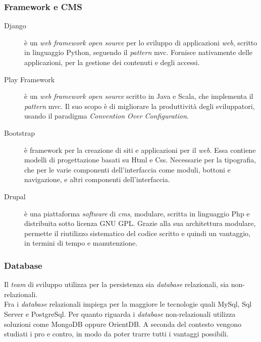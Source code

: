 \subsubsection{Framework e CMS}
\begin{description}
\item[Django] è un \emph{web \gls{framework} open source} per lo sviluppo di applicazioni \emph{web}, scritto in linguaggio Python, seguendo il \emph{pattern} \gls{mvc}. Fornisce nativamente delle applicazioni, per la gestione dei contenuti e degli accessi.
\item[Play Framework] è un \emph{web \gls{framework} open source} scritto in Java e Scala, che implementa il \emph{pattern} \gls{mvc}. Il suo scopo è di migliorare la produttività degli sviluppatori, usando il paradigma \emph{Convention Over Configuration}.\newpage
\item[Bootstrap] è \gls{framework} per la creazione di siti e applicazioni per il \emph{web}. Essa contiene modelli di progettazione basati su Html e Css. Necessarie per la tipografia, che per le varie componenti dell'interfaccia come moduli, bottoni e navigazione, e altri componenti dell'interfaccia.
\item[Drupal] è una piattaforma \emph{software} di \emph{\gls{cms}}, modulare, scritta in linguaggio Php e distribuita sotto licenza GNU GPL. Grazie alla sua architettura modulare, permette il riutilizzo sistematico del codice scritto e quindi un vantaggio, in termini di tempo e manutenzione.
\end{description}

\subsubsection{Database}
Il \emph{team} di sviluppo utilizza per la persistenza sia \emph{database} relazionali, sia non-relazionali.\\Fra i \emph{database} relazionali impiega per la maggiore le tecnologie quali MySql, Sql Server e PostgreSql. Per quanto riguarda i \emph{database} non-relazionali utilizza soluzioni come MongoDB oppure OrientDB. A seconda del contesto vengono studiati i pro e contro, in modo da poter trarre tutti i vantaggi possibili.




\newpage
